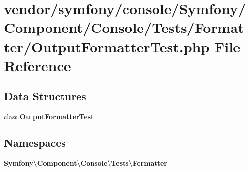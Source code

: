 \section{vendor/symfony/console/\+Symfony/\+Component/\+Console/\+Tests/\+Formatter/\+Output\+Formatter\+Test.php File Reference}
\label{_output_formatter_test_8php}
\subsection*{Data Structures}
\begin{DoxyCompactItemize}
\item 
class {\bf Output\+Formatter\+Test}
\end{DoxyCompactItemize}
\subsection*{Namespaces}
\begin{DoxyCompactItemize}
\item 
 {\bf Symfony\textbackslash{}\+Component\textbackslash{}\+Console\textbackslash{}\+Tests\textbackslash{}\+Formatter}
\end{DoxyCompactItemize}
